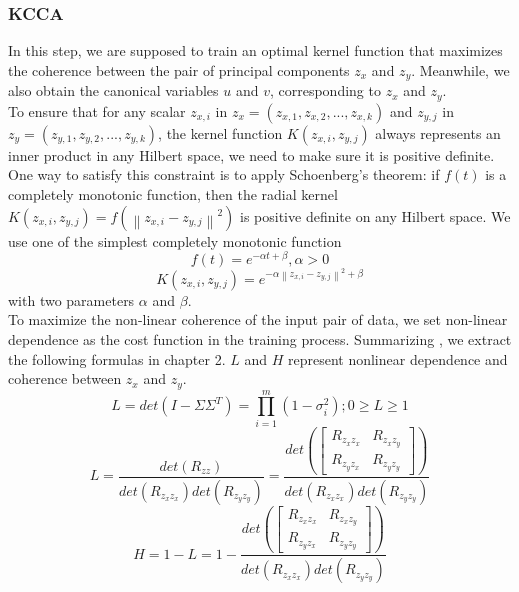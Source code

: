\documentclass[12pt]{report} %
\newcommand{\norm}[1]{\left\lVert #1 \right\rVert}
\begin{document}
\subsubsection{KCCA}
In this step, we are supposed to train an optimal kernel function that maximizes the coherence between the pair of principal components $z_x$ and $z_y$. Meanwhile, we also obtain the canonical variables $u$ and $v$, corresponding to $z_x$ and $z_y$. \\
To ensure that for any scalar \(z_{x,i}\) in \(z_x=(z_{x,1},z_{x,2},...,z_{x,k})\) and \(z_{y,j}\) in \(z_y=(z_{y,1},z_{y,2},...,z_{y,k})\), the kernel function $K(z_{x,i},z_{y,j})$ always represents an inner product in any Hilbert space, we need to make sure it is positive definite. One way to satisfy this constraint is to apply Schoenberg's theorem: if \(f(t)\) is a completely monotonic function, then the radial kernel $K(z_{x,i},z_{y,j})=f(\norm{z_{x,i}-z_{y,j}}^2)$ is positive definite on any Hilbert space. We use one of the simplest completely monotonic function
\begin{equation}
f(t)=e^{-\alpha t + \beta}, \alpha>0
\end{equation}
\begin{equation}
K(z_{x,i},z_{y,j})=e^{-\alpha \norm{z_{x,i}-z_{y,j}}^2 + \beta}
\end{equation}
with two parameters $\alpha$ and $\beta$.\\
To maximize the non-linear coherence of the input pair of data, we set non-linear dependence as the cost function in the training process. Summarizing \cite{ECCA}, we extract the following formulas in chapter 2. $L$ and $H$ represent nonlinear dependence and coherence between $z_x$ and $z_y$.
\begin{equation}
L=det(I-\Sigma\Sigma^T)=\prod_{i=1}^{m}(1-\sigma_i^2);0 \geq L \geq 1
\end{equation}
\begin{equation}
L=\frac{det(R_{zz})}
{det(R_{z_{x}z_{x}})det(R_{z_{y}z_{y}})}=\frac{det(\begin{bmatrix}
	R_{z_{x}z_{x}} & R_{z_{x}z_{y}} \\
	R_{z_{y}z_{x}} & R_{z_{y}z_{y}}
	\end{bmatrix})}
{det(R_{z_{x}z_{x}})det(R_{z_{y}z_{y}})}
\end{equation}
\begin{equation}
H=1-L=1-\frac{det(\begin{bmatrix}
	R_{z_{x}z_{x}} & R_{z_{x}z_{y}} \\
	R_{z_{y}z_{x}} & R_{z_{y}z_{y}}
	\end{bmatrix})}
{det(R_{z_{x}z_{x}})det(R_{z_{y}z_{y}})}
\end{equation}
\end{document}
